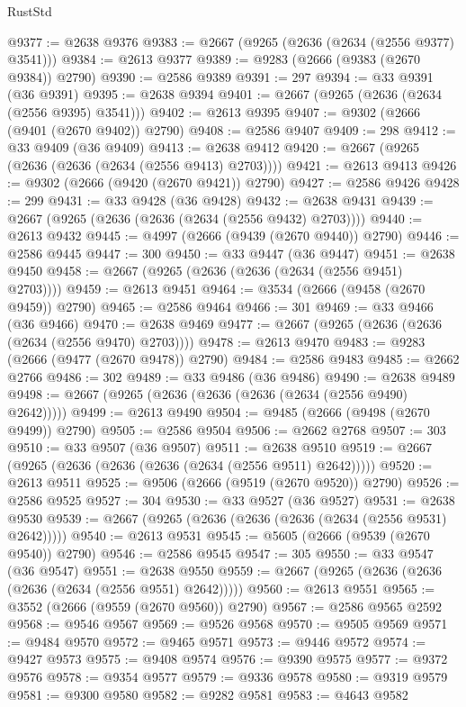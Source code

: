 \begin{lexlean}{RustStd}
\begin{coremodule}
@9377 := @2638 @9376
@9383 := @2667 (@9265 (@2636 (@2634 (@2556 @9377) @3541)))
@9384 := @2613 @9377
@9389 := @9283 (@2666 (@9383 (@2670 @9384)) @2790)
@9390 := @2586 @9389
@9391 := 297
@9394 := @33 @9391 (@36 @9391)
@9395 := @2638 @9394
@9401 := @2667 (@9265 (@2636 (@2634 (@2556 @9395) @3541)))
@9402 := @2613 @9395
@9407 := @9302 (@2666 (@9401 (@2670 @9402)) @2790)
@9408 := @2586 @9407
@9409 := 298
@9412 := @33 @9409 (@36 @9409)
@9413 := @2638 @9412
@9420 := @2667 (@9265 (@2636 (@2636 (@2634 (@2556 @9413) @2703))))
@9421 := @2613 @9413
@9426 := @9302 (@2666 (@9420 (@2670 @9421)) @2790)
@9427 := @2586 @9426
@9428 := 299
@9431 := @33 @9428 (@36 @9428)
@9432 := @2638 @9431
@9439 := @2667 (@9265 (@2636 (@2636 (@2634 (@2556 @9432) @2703))))
@9440 := @2613 @9432
@9445 := @4997 (@2666 (@9439 (@2670 @9440)) @2790)
@9446 := @2586 @9445
@9447 := 300
@9450 := @33 @9447 (@36 @9447)
@9451 := @2638 @9450
@9458 := @2667 (@9265 (@2636 (@2636 (@2634 (@2556 @9451) @2703))))
@9459 := @2613 @9451
@9464 := @3534 (@2666 (@9458 (@2670 @9459)) @2790)
@9465 := @2586 @9464
@9466 := 301
@9469 := @33 @9466 (@36 @9466)
@9470 := @2638 @9469
@9477 := @2667 (@9265 (@2636 (@2636 (@2634 (@2556 @9470) @2703))))
@9478 := @2613 @9470
@9483 := @9283 (@2666 (@9477 (@2670 @9478)) @2790)
@9484 := @2586 @9483
@9485 := @2662 @2766
@9486 := 302
@9489 := @33 @9486 (@36 @9486)
@9490 := @2638 @9489
@9498 := @2667 (@9265 (@2636 (@2636 (@2636 (@2634 (@2556 @9490) @2642)))))
@9499 := @2613 @9490
@9504 := @9485 (@2666 (@9498 (@2670 @9499)) @2790)
@9505 := @2586 @9504
@9506 := @2662 @2768
@9507 := 303
@9510 := @33 @9507 (@36 @9507)
@9511 := @2638 @9510
@9519 := @2667 (@9265 (@2636 (@2636 (@2636 (@2634 (@2556 @9511) @2642)))))
@9520 := @2613 @9511
@9525 := @9506 (@2666 (@9519 (@2670 @9520)) @2790)
@9526 := @2586 @9525
@9527 := 304
@9530 := @33 @9527 (@36 @9527)
@9531 := @2638 @9530
@9539 := @2667 (@9265 (@2636 (@2636 (@2636 (@2634 (@2556 @9531) @2642)))))
@9540 := @2613 @9531
@9545 := @5605 (@2666 (@9539 (@2670 @9540)) @2790)
@9546 := @2586 @9545
@9547 := 305
@9550 := @33 @9547 (@36 @9547)
@9551 := @2638 @9550
@9559 := @2667 (@9265 (@2636 (@2636 (@2636 (@2634 (@2556 @9551) @2642)))))
@9560 := @2613 @9551
@9565 := @3552 (@2666 (@9559 (@2670 @9560)) @2790)
@9567 := @2586 @9565 @2592
@9568 := @9546 @9567
@9569 := @9526 @9568
@9570 := @9505 @9569
@9571 := @9484 @9570
@9572 := @9465 @9571
@9573 := @9446 @9572
@9574 := @9427 @9573
@9575 := @9408 @9574
@9576 := @9390 @9575
@9577 := @9372 @9576
@9578 := @9354 @9577
@9579 := @9336 @9578
@9580 := @9319 @9579
@9581 := @9300 @9580
@9582 := @9282 @9581
@9583 := @4643 @9582

\end{coremodule}
\end{lexlean}
